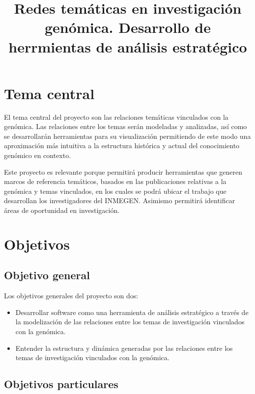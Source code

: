 \documentclass[letterpaper,12pt]{article}
\begin{document}
\title{Redes temáticas en investigación genómica. Desarrollo de herrmientas de análisis estratégico}
\maketitle

\section{Tema central}

El tema central del proyecto son las relaciones temáticas vinculados con la genómica. Las relaciones entre los temas serán modeladas y analizadas, así como se desarrollarán herramientas para su visualización permitiendo de este modo una aproximación más intuitiva a la estructura histórica y actual del conocimiento genómico en contexto. 

Este proyecto es relevante porque permitirá producir herramientas que generen marcos de referencia temáticos, basados en las publicaciones relativas a la genómica y temas vinculados, en los cuales se podrá ubicar el trabajo que desarrollan los investigadores del INMEGEN. Asimismo permitirá identificar áreas de oportunidad en investigación.

\section{Objetivos}

\subsection{Objetivo general}
Los objetivos generales del proyecto son dos:

\begin{itemize}

\item {Desarrollar software como una herramienta de análisis estratégico a través de la modelización de las relaciones entre los temas de investigación vinculados con la genómica.}

\item {Entender la estructura y dinámica generadas por las relaciones entre los temas de investigación vinculados con la genómica.}

\end{itemize}

\subsection{Objetivos particulares}
\end{document}
